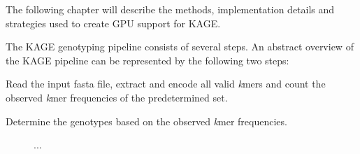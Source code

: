 The following chapter will describe the methods, implementation details and strategies used to create GPU support for KAGE.

The KAGE genotyping pipeline consists of several steps. 
An abstract overview of the KAGE pipeline can be represented by the following two steps:
\begin{compactenum}
  \item
    Read the input fasta file, extract and encode all valid \textit{k}mers and count the observed \textit{k}mer frequencies of the predetermined set.
  \item
    Determine the genotypes based on the observed \textit{k}mer frequencies.
\end{compactenum}

\begin{figure}[!ht]\label{figure:KAGE-pipeline}
\begin{center}
\caption{...}
\end{center}
\end{figure}
